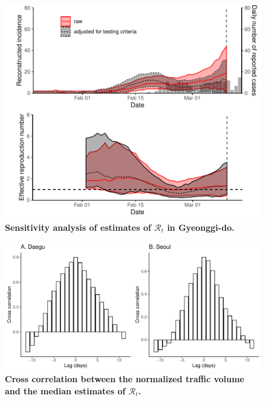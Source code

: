 \pagebreak

\begin{figure}[!ht]
\includegraphics[width=\textwidth]{figure_R_t_gyeonggi.pdf}
\caption{
\textbf{Sensitivity analysis of estimates of $\mathcal R_t$ in Gyeonggi-do.}
}
\end{figure}

\pagebreak

\begin{figure}[!ht]
\includegraphics[width=\textwidth]{figure_cross.pdf}
\caption{
\textbf{Cross correlation between the normalized traffic volume and the median estimates of $\mathcal R_t$.}
}
\end{figure}
